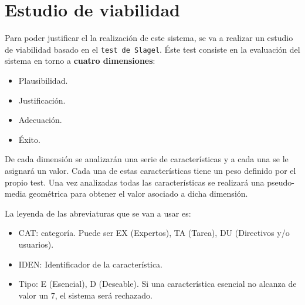 \documentclass[a4paper,12pt]{article}
\begin{document}
\section{Estudio de viabilidad}
Para poder justificar el la realización de este sistema, se va a realizar un estudio de viabilidad basado en el \texttt{test de Slagel}.
Éste test consiste en la evaluación del sistema en torno a \textbf{cuatro dimensiones}:
\begin{itemize}
\item Plausibilidad.
\item Justificación.
\item Adecuación.
\item Éxito.
\end{itemize}

De cada dimensión se analizarán una serie de características y a cada una se le asignará un valor. Cada una de estas características tiene un peso definido por el propio test. Una vez analizadas todas las características se realizará una pseudo-media geométrica para obtener el valor asociado a dicha dimensión.

La leyenda de las abreviaturas que se van a usar es:
\begin{itemize}
\item CAT: categoría. Puede ser EX (Expertos), TA (Tarea), DU (Directivos y/o usuarios).
\item IDEN: Identificador de la característica.
\item Tipo: E (Esencial), D (Deseable). Si una característica esencial no alcanza de valor un 7, el sistema será rechazado.
\end{itemize}

\newpage
\end{document}
